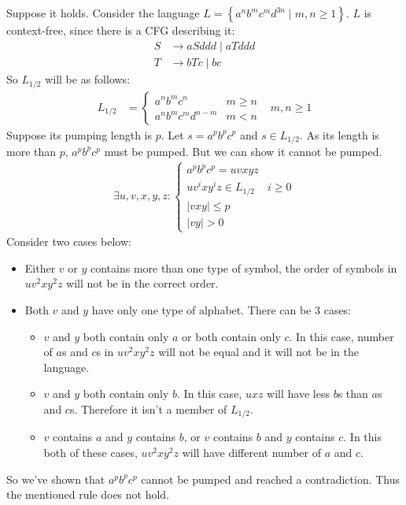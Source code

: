 \documentclass{article}
\numberwithin{equation}{subsection}
\newcommand{\abs}[1]{\vert #1\vert}
\begin{document}
\subsection{}
Suppose it holds.
Consider the language \(L=\left\{a^nb^mc^md^{3n}\mid m,n \ge 1\right\}\).
\(L\) is context-free, since there is a CFG describing it:
\begin{align*}
S &\to aSddd \mid aTddd\\
T &\to bTc \mid bc
\end{align*}
So \(L_{1/2}\) will be as follows:
\begin{align*}
L_{1/2}&=
\begin{cases}
a^nb^mc^n & m\ge n\\
a^nb^mc^md^{n-m} & m<n
\end{cases} & m,n\ge 1
\end{align*}
Suppose its pumping length is \(p\).
Let \(s=a^pb^pc^p\) and \(s\in L_{1/2}\).
As its length is more than \(p\), \(a^pb^pc^p\) must be pumped.
But we can show it cannot be pumped.
\begin{align*}
\exists u,v,x,y,z:
\begin{cases}
a^pb^pc^p = uvxyz&\\
uv^ixy^iz\in L_{1/2} & i\ge 0\\
\abs{vxy} \le p&\\
\abs{vy} > 0&
\end{cases}
\end{align*}
Consider two cases below:
\begin{itemize}
\item Either \(v\) or \(y\) contains more than one type of symbol, the order of symbols in \(uv^2xy^2z\) will not be in the correct order.
\item Both \(v\) and \(y\) have only one type of alphabet.
There can be 3 cases:
\begin{itemize}
\item \(v\) and \(y\) both contain only \(a\) or both contain only \(c\).
In this case, number of \(a\)s and \(c\)s in \(uv^2xy^2z\) will not be equal and it will not be in the language.
\item \(v\) and \(y\) both contain only \(b\).
In this case, \(uxz\) will have less \(b\)s than \(a\)s and \(c\)s.
Therefore it isn't a member of \(L_{1/2}\).
\item \(v\) contains \(a\) and \(y\) contains \(b\), or \(v\) contains \(b\) and \(y\) contains \(c\).
In this both of these cases, \(uv^2xy^2z\) will have different number of \(a\) and \(c\).
\end{itemize}
\end{itemize}
So we've shown that \(a^pb^pc^p\) cannot be pumped and reached a contradiction.
Thus the mentioned rule does not hold.
\end{document}
